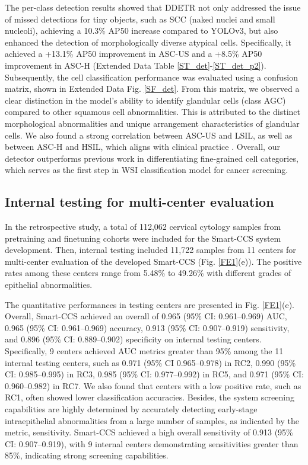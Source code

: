 The per-class detection results showed that DDETR not only addressed the issue of missed detections for tiny objects, such as SCC (naked nuclei and small nucleoli), achieving a 10.3\% AP50 increase compared to YOLOv3, but also enhanced the detection of morphologically diverse atypical cells. Specifically, it achieved a +13.1\% AP50 improvement in ASC-US and a +8.5\% AP50 improvement in ASC-H (Extended Data Table \ref{ST_det}-\ref{ST_det_p2}). Subsequently, the cell classification performance was evaluated using a confusion matrix, shown in Extended Data Fig. \ref{SF_det}. From this matrix, we observed a clear distinction in the model's ability to identify glandular cells (class AGC) compared to other squamous cell abnormalities. This is attributed to the distinct morphological abnormalities and unique arrangement characteristics of glandular cells. We also found a strong correlation between ASC-US and LSIL, as well as between ASC-H and HSIL, which aligns with clinical practice \cite{nayar2015bethesda,vandenbussche2022cytologic}. Overall, our detector outperforms previous work in differentiating fine-grained cell categories, which serves as the first step in WSI classification model for cancer screening.

\subsection*{Internal testing for multi-center evaluation}\label{subsec2-5}
In the retrospective study, a total of 112,062 cervical cytology samples from pretraining and finetuning cohorts were included for the Smart-CCS system development. Then, internal testing included 11,722 samples from 11 centers for multi-center evaluation of the developed Smart-CCS (Fig. \ref{FE1}(e)). The positive rates among these centers range from 5.48\% 
 to 49.26\% with different grades of epithelial abnormalities.

The quantitative performances in testing centers are presented in Fig. \ref{FE1}(e). 
Overall, Smart-CCS achieved an overall of 0.965 (95\% CI: 0.961–0.969) AUC, 0.965 (95\% CI: 0.961–0.969) accuracy, 0.913 (95\% CI: 0.907–0.919) sensitivity, and  0.896 (95\% CI: 0.889–0.902) specificity on internal testing centers. Specifically, 9 centers achieved AUC metrics greater than  95\% among the 11 internal testing centers, such as 0.971 (95\% CI 0.965–0.978) in RC2, 0.990 (95\% CI: 0.985–0.995) in RC3, 0.985 (95\% CI: 0.977–0.992) in RC5, and 0.971 (95\% CI: 0.960–0.982) in RC7. We also found that centers with a low positive rate, such as RC1, often showed lower classification accuracies. Besides, the system screening capabilities are highly determined by accurately detecting early-stage intraepithelial abnormalities from a large number of samples, as indicated by the metric, sensitivity. Smart-CCS achieved a high overall sensitivity of 0.913 (95\% CI: 0.907–0.919), with 9 internal centers demonstrating sensitivities greater than 85\%, indicating strong screening capabilities.

